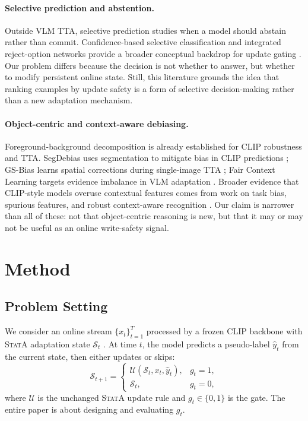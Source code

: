 \documentclass{article}
\newcommand{\stata}{\textsc{StatA}}
\begin{document}
\paragraph{Selective prediction and abstention.}
Outside VLM TTA, selective prediction studies when a model should abstain rather than commit. Confidence-based selective classification and integrated reject-option networks provide a broader conceptual backdrop for update gating \citep{geifman2017selective, geifman2019selectivenet}. Our problem differs because the decision is not whether to answer, but whether to modify persistent online state. Still, this literature grounds the idea that ranking examples by update safety is a form of selective decision-making rather than a new adaptation mechanism.

\paragraph{Object-centric and context-aware debiasing.}
Foreground-background decomposition is already established for CLIP robustness and TTA. SegDebias uses segmentation to mitigate bias in CLIP predictions \citep{wu2025segdebias}; GS-Bias learns spatial corrections during single-image TTA \citep{huang2025gsbias}; Fair Context Learning targets evidence imbalance in VLM adaptation \citep{yun2026fair}. Broader evidence that CLIP-style models overuse contextual features comes from work on task bias, spurious features, and robust context-aware recognition \citep{menon2022task, wang2024sober, janouskova2025robust}. Our claim is narrower than all of these: not that object-centric reasoning is new, but that it may or may not be useful as an online write-safety signal.

\section{Method}
\label{sec:method}

\subsection{Problem Setting}

We consider an online stream $\{x_t\}_{t=1}^T$ processed by a frozen CLIP backbone with \stata{} adaptation state $\mathcal{S}_t$ \citep{zanella2025realistic}. At time $t$, the model predicts a pseudo-label $\hat{y}_t$ from the current state, then either updates or skips:
\begin{equation}
\mathcal{S}_{t+1} =
\begin{cases}
\mathcal{U}(\mathcal{S}_t, x_t, \hat{y}_t), & g_t = 1, \\
\mathcal{S}_t, & g_t = 0,
\end{cases}
\end{equation}
where $\mathcal{U}$ is the unchanged \stata{} update rule and $g_t \in \{0,1\}$ is the gate. The entire paper is about designing and evaluating $g_t$.
\end{document}
